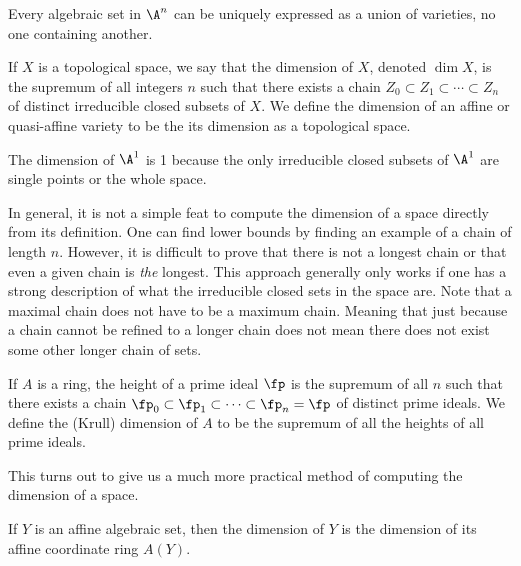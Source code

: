 \begin{cor}
Every algebraic set in $\A^n$ can be uniquely expressed as a union of varieties, no one containing another. 
\end{cor}


\begin{dfn}[Dimension]
If $X$ is a topological space, we say that the dimension of $X$, denoted $\dim X$, is the supremum of all integers $n$ such that there exists a chain $Z_0 \subset Z_1 \subset \cdots \subset Z_n$ of distinct irreducible closed subsets of $X$. We define the dimension of an affine or quasi-affine variety to be the its dimension as a topological space.  
\end{dfn}


\begin{ex}
The dimension of $\A^1$ is 1 because the only irreducible closed subsets of $\A^1$ are single points or the whole space. \xqed
\end{ex}


\begin{rem}
In general, it is not a simple feat to compute the dimension of a space directly from its definition. One can find lower bounds by finding an example of a chain of length $n$. However, it is difficult to prove that there is not a longest chain or that even a given chain is \emph{the} longest. This approach generally only works if one has a strong description of what the irreducible closed sets in the space are. Note that a maximal chain does not have to be a maximum chain. Meaning that just because a chain cannot be refined to a longer chain does not mean there does not exist some other longer chain of sets. 
\end{rem}


\begin{dfn}
If $A$ is a ring, the height of a prime ideal $\fp$ is the supremum of all $n$ such that there exists a chain $\fp_0 \subset \fp_1 \subset \cdots \subset \fp_n= \fp$ of distinct prime ideals. We define the (Krull) dimension of $A$ to be the supremum of all the heights of all prime ideals.
\end{dfn}


This turns out to give us a much more practical method of computing the dimension of a space.


\begin{prop} \label{prop:coord_rng}
If $Y$ is an affine algebraic set, then the dimension of $Y$ is the dimension of its affine coordinate ring $A(Y)$.
\end{prop}

